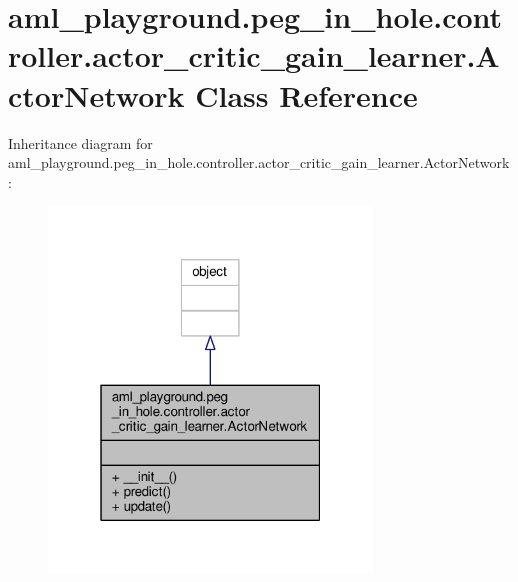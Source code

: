 \hypertarget{classaml__playground_1_1peg__in__hole_1_1controller_1_1actor__critic__gain__learner_1_1_actor_network}{\section{aml\-\_\-playground.\-peg\-\_\-in\-\_\-hole.\-controller.\-actor\-\_\-critic\-\_\-gain\-\_\-learner.\-Actor\-Network Class Reference}
\label{classaml__playground_1_1peg__in__hole_1_1controller_1_1actor__critic__gain__learner_1_1_actor_network}
}


Inheritance diagram for aml\-\_\-playground.\-peg\-\_\-in\-\_\-hole.\-controller.\-actor\-\_\-critic\-\_\-gain\-\_\-learner.\-Actor\-Network\-:
\nopagebreak
\begin{figure}[H]
\begin{center}
\leavevmode
\includegraphics[width=244pt]{classaml__playground_1_1peg__in__hole_1_1controller_1_1actor__critic__gain__learner_1_1_actor_network__inherit__graph}
\end{center}
\end{figure}


